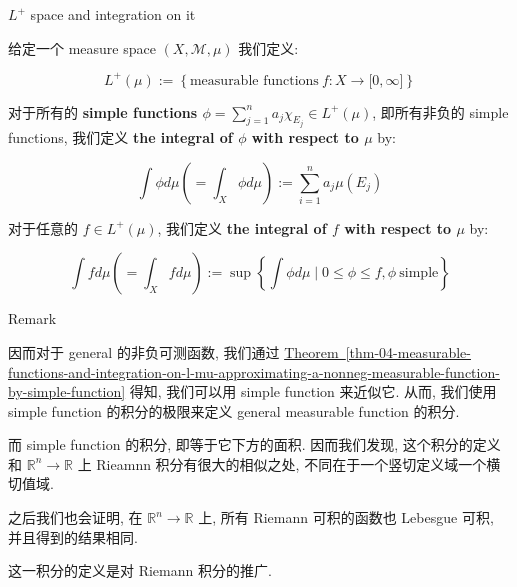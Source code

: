 \documentclass{qlnotes-export}
\begin{document}
\begin{definition}{\(L^{+}\) space and integration on it}\label{def-04-measurable-functions-and-integration-on-l-mu-l-space-and-integration-on-it}

给定一个 measure space \((X,\mathcal{M},\mu)\) 我们定义:

\[L^{+}(\mu) := \left\{ {\text{measurable functions}\ f:X\rightarrow\lbrack 0,\infty\rbrack} \right\}\]

对于所有的 \textbf{simple functions \(\phi = \sum_{j = 1}^{n}a_{j}\chi_{E_{j}} \in L^{+}(\mu)\)}, 即所有非负的 simple functions, 我们定义 \textbf{the integral of \(\phi\) with respect to \(\mu\)} by:

\[\int\phi d\mu( = \int_{X}\phi d\mu) := \sum\limits_{i = 1}^{n}a_{j}\mu(E_{j})\]

对于任意的 \(f \in L^{+}(\mu)\), 我们定义 \textbf{the integral of \(f\) with respect to \(\mu\)} by:

\[\int fd\mu( = \int_{X}fd\mu) := \sup\left\{ {\int\phi d\mu \mid 0 \leq \phi \leq f,\phi\ \text{simple}} \right\}\]

\end{definition}

\begin{qlremark}{Remark}

因而对于 general 的非负可测函数, 我们通过 \hyperref[thm-04-measurable-functions-and-integration-on-l-mu-approximating-a-nonneg-measurable-function-by-simple-function]{Theorem~\ref*{thm-04-measurable-functions-and-integration-on-l-mu-approximating-a-nonneg-measurable-function-by-simple-function}} 得知, 我们可以用 simple function 来近似它. 从而, 我们使用 simple function 的积分的极限来定义 general measurable function 的积分.

而 simple function 的积分, 即等于它下方的面积. 因而我们发现, 这个积分的定义和 \({\mathbb{R}}^{n}\rightarrow{\mathbb{R}}\) 上 Rieamnn 积分有很大的相似之处, 不同在于一个竖切定义域一个横切值域.

之后我们也会证明, 在 \({\mathbb{R}}^{n}\rightarrow{\mathbb{R}}\) 上, 所有 Riemann 可积的函数也 Lebesgue 可积, 并且得到的结果相同.

这一积分的定义是对 Riemann 积分的推广.

\end{qlremark}
\end{document}
